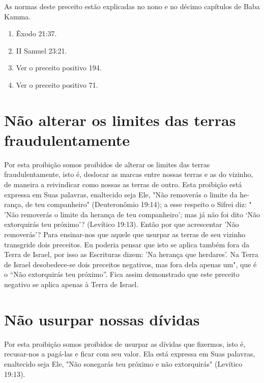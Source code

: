 As normas deste preceito estão explicadas no nono e no décimo ca­pítulos
de Baba Kamma.


\begin{enumerate}
\def\labelenumi{\arabic{enumi}.}
\setcounter{enumi}{402}
\item
 
 Êxodo 21:37.
 
\item
 
 II Samuel 23:21.
 
\item
 
 Ver o preceito positivo 194.
 
\item
 
 Ver o preceito positivo 71.
 
\end{enumerate}



\section{Não alterar os limites das terras fraudulentamente}

Por esta proibição somos proibidos de alterar os limites das terras
fraudulentamente, isto é, deslocar as marcas entre nossas terras e as do
vizinho, de maneira a reivindicar como nossas as terras de outro. Esta
proibição está expressa em Suas palavras, enaltecido seja Ele, "Não
removerás o limite da he­rança, de teu companheiro" (Deuteronômio
19:14); a esse respeito o Sifrei diz: " 'Não removerás o limite da
herança de teu companheiro'; mas já não foi dito `Não extorquirás teu
próximo'? (Levítico 19:13). Então por que acrescentar 'Não removerás'?
Para ensinar-nos que aquele que usurpar as terras de seu vizinho
transgride dois preceitos. Eu poderia pensar que isto se aplica também
fora da Terra de Israel, por isso as Escrituras dizem: 'Na herança que
herdares'. Na Ter­ra de Israel desobedece-se dois preceitos negativos,
mas fora dela apenas um", que é o ``Não extorquirás teu próximo''. Fica
assim demonstrado que este pre­ceito negativo se aplica apenas à Terra
de Israel.

\section{Não usurpar nossas dívidas}

Por esta proibição somos proibidos de usurpar as dívidas que fizer­mos,
isto é, recusar-nos a pagá-las e ficar com seu valor. Ela está expressa
em Suas palavras, enaltecido seja Ele, "Não sonegarás teu próximo e não
extorqui­rás" (Levítico 19:13).

